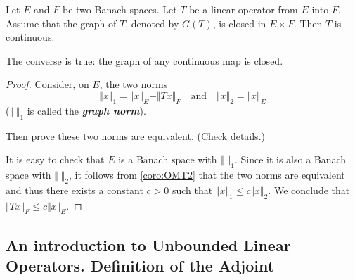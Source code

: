 \documentclass{article}
\theoremstyle{definition}
\numberwithin{equation}{section}
\begin{document}
	\begin{thm}
		Let $E$ and $F$ be two Banach spaces. Let $T$ be a linear operator from $E$ into $F$. Assume that the graph of $T$, denoted by $G(T)$, is closed in $E\times F$. Then $T$ is continuous.
	\end{thm}
	\begin{remark}
		The converse is true: the graph of any continuous map is closed.
	\end{remark}
	\begin{proof}
		Consider, on $E$, the two norms
		\[\Vert x\Vert_1=\Vert x\Vert_E+\Vert Tx\Vert_F\quad\text{and}\quad\Vert x\Vert_2=\Vert x\Vert_E\]
		($\Vert\;\Vert_1$ is called the \textbf{\textit{graph norm}}).
		
		{\color{orange}Then prove these two norms are equivalent. (Check details.)}
		
		It is easy to check that $E$ is a Banach space with $\Vert\;\Vert_1$. Since it is also a Banach space with $\Vert\;\Vert_2$, it follows from \cref{coro:OMT2} that the two norms are equivalent and thus there exists a constant $c>0$ such that $\Vert x\Vert_1\leq c\Vert x\Vert_2$. We conclude that $\Vert Tx\Vert_F\leq c\Vert x\Vert_E$. 
	\end{proof}
	
	\subsection{An introduction to Unbounded Linear Operators. Definition of the Adjoint}
	
\end{document}
